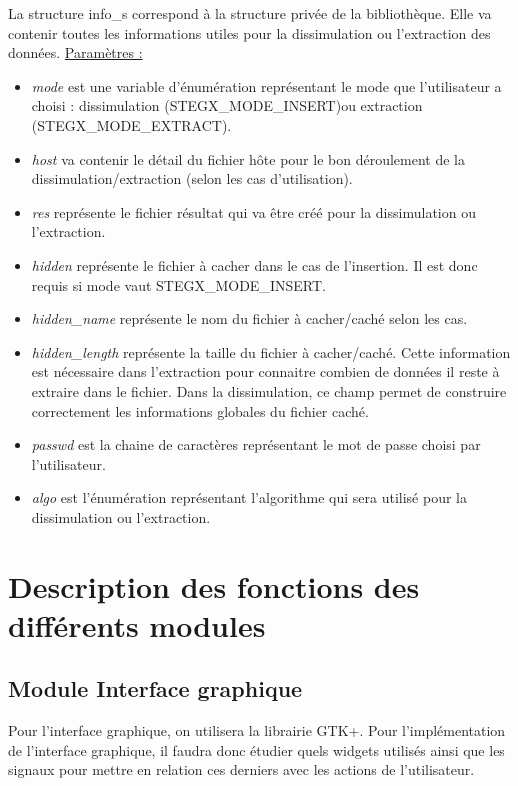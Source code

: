 \documentclass[11pt]{article}
\begin{document}
La structure info\_s correspond à la structure privée de la bibliothèque. 
Elle va contenir toutes les informations utiles pour la dissimulation ou 
l'extraction des données. 
\newline
\underline{Paramètres :}
\begin{itemize}
\item \textit{mode} est une variable d'énumération représentant le mode que 
l'utilisateur a choisi : dissimulation (STEGX\_MODE\_INSERT)ou extraction 
(STEGX\_MODE\_EXTRACT). 
\item \textit{host} va contenir le détail du fichier hôte pour le bon déroulement 
de la dissimulation/extraction (selon les cas d'utilisation). 
\item \textit{res} représente le fichier résultat qui va être créé pour la 
dissimulation ou l'extraction.  
\item \textit{hidden} représente le fichier à cacher dans le cas de l'insertion. 
Il est donc requis si mode vaut STEGX\_MODE\_INSERT. 
\item \textit{hidden\_name} représente le nom du fichier à cacher/caché selon 
les cas. 
\item \textit{hidden\_length} représente la taille du fichier à cacher/caché. 
Cette information est nécessaire dans l'extraction pour connaitre combien de 
données il reste à extraire dans le fichier. Dans la dissimulation, ce champ 
permet de construire correctement les informations globales du fichier caché. 
\item \textit{passwd} est la chaine de caractères représentant le mot de passe 
choisi par l'utilisateur. 
\item \textit{algo} est l'énumération représentant l'algorithme qui sera utilisé
pour la dissimulation ou l'extraction. 
\newline
\end{itemize}

\section{Description des fonctions des différents modules}

\subsection{Module Interface graphique}

Pour l'interface graphique, on utilisera la librairie GTK+. Pour l'implémentation 
de l'interface graphique, il faudra donc étudier quels widgets utilisés 
ainsi que les signaux pour mettre en relation ces derniers avec les 
actions de l'utilisateur. 
\end{document}
